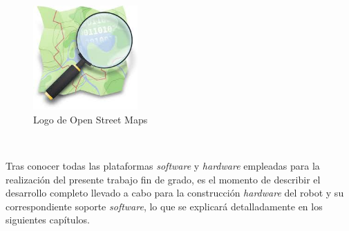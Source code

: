\begin{figure} [h!]
	\begin{center}
		\includegraphics[width=4cm]{figs/osm.png}
	\end{center}
	\caption{Logo de Open Street Maps}  %
	\label{fig:osm}
\end{figure}\ 




Tras conocer todas las plataformas \textit{software} y \textit{hardware} empleadas para la realización del presente trabajo fin de grado, es el momento de describir el desarrollo completo llevado a cabo para la construcción \textit{hardware} del robot y su correspondiente soporte \textit{software}, lo que se explicará detalladamente en los siguientes capítulos.
